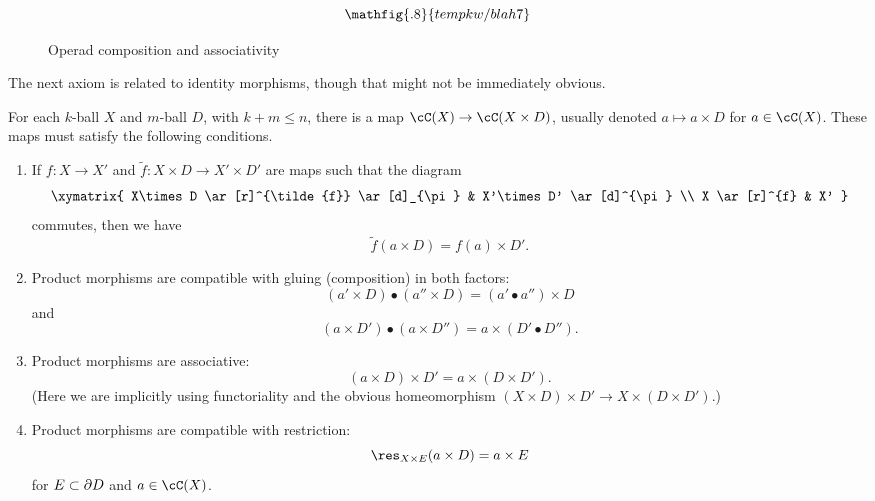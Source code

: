 \begin{figure}[!ht]
$$\mathfig{.8}{tempkw/blah7}$$
\caption{Operad composition and associativity}\label{blah7}\end{figure}

The next axiom is related to identity morphisms, though that might not be immediately obvious.

\begin{axiom}
For each $k$-ball $X$ and $m$-ball $D$, with $k+m \le n$, there is a map $\cC(X)\to \cC(X\times D)$, 
usually denoted $a\mapsto a\times D$ for $a\in \cC(X)$.
These maps must satisfy the following conditions.
\begin{enumerate}
\item
If $f:X\to X'$ and $\tilde{f}:X\times D \to X'\times D'$ are maps such that the diagram
\[ \xymatrix{
	X\times D \ar[r]^{\tilde{f}} \ar[d]_{\pi} & X'\times D' \ar[d]^{\pi} \\
	X \ar[r]^{f} & X'
} \]
commutes, then we have 
\[
	\tilde{f}(a\times D) = f(a)\times D' .
\]
\item
Product morphisms are compatible with gluing (composition) in both factors:
\[
	(a'\times D)\bullet(a''\times D) = (a'\bullet a'')\times D
\]
and
\[
	(a\times D')\bullet(a\times D'') = a\times (D'\bullet D'') .
\]
\item
Product morphisms are associative:
\[
	(a\times D)\times D' = a\times (D\times D') .
\]
(Here we are implicitly using functoriality and the obvious homeomorphism
$(X\times D)\times D' \to X\times(D\times D')$.)
\item
Product morphisms are compatible with restriction:
\[
	\res_{X\times E}(a\times D) = a\times E
\]
for $E\subset \partial D$ and $a\in \cC(X)$.
\end{enumerate}
\end{axiom}

